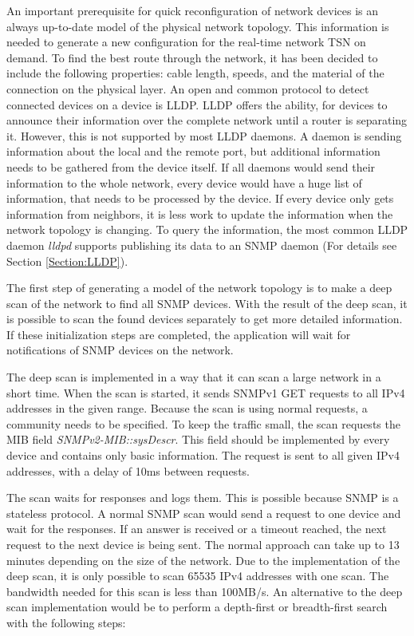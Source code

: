 \label{Section:Concept}

An important prerequisite for quick reconfiguration of network devices is an always up-to-date model of the physical network topology. This information is needed to generate a new configuration for the real-time network TSN on demand. To find the best route through the network, it has been decided to include the following properties: cable length, speeds, and the material of the connection on the physical layer. An open and common protocol to detect connected devices on a device is LLDP. LLDP offers the ability, for devices to announce their information over the complete network until a router is separating it. However, this is not supported by most LLDP daemons. A daemon is sending information about the local and the remote port, but additional information needs to be gathered from the device itself. If all daemons would send their information to the whole network, every device would have a huge list of information, that needs to be processed by the device. If every device only gets information from neighbors, it is less work to update the information when the network topology is changing. To query the information, the most common LLDP daemon \textit{lldpd} supports publishing its data to an SNMP daemon (For details see Section \ref{Section:LLDP}).

The first step of generating a model of the network topology is to make a deep scan of the network to find all SNMP devices. With the result of the deep scan, it is possible to scan the found devices separately to get more detailed information. If these initialization steps are completed, the application will wait for notifications of SNMP devices on the network.

The deep scan is implemented in a way that it can scan a large network in a short time. When the scan is started, it sends SNMPv1 GET requests to all IPv4 addresses in the given range. Because the scan is using normal requests, a community needs to be specified. To keep the traffic small, the scan requests the MIB field \textit{SNMPv2-MIB::sysDescr}. This field should be implemented by every device and contains only basic information. The request is sent to all given IPv4 addresses, with a delay of 10ms between requests.

The scan waits for responses and logs them. This is possible because SNMP is a stateless protocol. A normal SNMP scan would send a request to one device and wait for the responses. If an answer is received or a timeout reached, the next request to the next device is being sent. The normal approach can take up to 13 minutes depending on the size of the network. Due to the implementation of the deep scan, it is only possible to scan 65535 IPv4 addresses with one scan. The bandwidth needed for this scan is less than 100MB/s. An alternative to the deep scan implementation would be to perform a depth-first or breadth-first search with the following steps:

